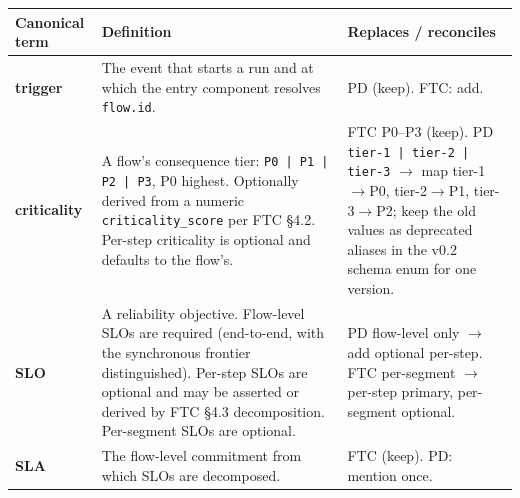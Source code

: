 \documentclass[11pt]{article}
\newcommand{\code}[1]{\texttt{#1}}
\begin{document}
\begin{center}
\footnotesize
\begin{tabular}{@{}p{2.7cm} p{7.1cm} p{5.6cm}@{}}
\toprule
\textbf{Canonical term} & \textbf{Definition} & \textbf{Replaces / reconciles} \\
\midrule
\textbf{trigger} & The event that starts a run and at which the entry component resolves \code{flow.id}. & PD (keep). FTC: add. \\
\addlinespace
\textbf{criticality} & A flow's consequence tier: \code{P0 | P1 | P2 | P3}, P0 highest. Optionally derived from a numeric \code{criticality\_score} per FTC \S4.2. Per-step criticality is optional and defaults to the flow's. & FTC P0--P3 (keep). PD \code{tier-1 | tier-2 | tier-3} \(\rightarrow\) map tier-1\(\rightarrow\)P0, tier-2\(\rightarrow\)P1, tier-3\(\rightarrow\)P2; keep the old values as deprecated aliases in the v0.2 schema enum for one version. \\
\addlinespace
\textbf{SLO} & A reliability objective. Flow-level SLOs are required (end-to-end, with the synchronous frontier distinguished). Per-step SLOs are optional and may be asserted or derived by FTC \S4.3 decomposition. Per-segment SLOs are optional. & PD flow-level only \(\rightarrow\) add optional per-step. FTC per-segment \(\rightarrow\) per-step primary, per-segment optional. \\
\addlinespace
\textbf{SLA} & The flow-level commitment from which SLOs are decomposed. & FTC (keep). PD: mention once. \\
\bottomrule
\end{tabular}
\end{center}
\end{document}
